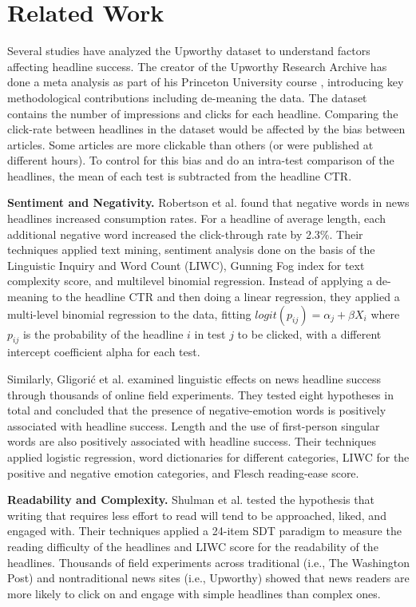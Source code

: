 \documentclass[11pt]{article}
\begin{document}
\section{Related Work}

Several studies have analyzed the Upworthy dataset to understand factors affecting headline success. The creator of the Upworthy Research Archive has done a meta analysis as part of his Princeton University course \cite{matias2020meta}, introducing key methodological contributions including de-meaning the data. The dataset contains the number of impressions and clicks for each headline. Comparing the click-rate between headlines in the dataset would be affected by the bias between articles. Some articles are more clickable than others (or were published at different hours). To control for this bias and do an intra-test comparison of the headlines, the mean of each test is subtracted from the headline CTR.

\textbf{Sentiment and Negativity.} Robertson et al. \cite{robertson2023negativity} found that negative words in news headlines increased consumption rates. For a headline of average length, each additional negative word increased the click-through rate by 2.3\%. Their techniques applied text mining, sentiment analysis done on the basis of the Linguistic Inquiry and Word Count (LIWC), Gunning Fog index for text complexity score, and multilevel binomial regression. Instead of applying a de-meaning to the headline CTR and then doing a linear regression, they applied a multi-level binomial regression to the data, fitting $logit(p_{ij}) = \alpha_j + \beta X_i$ where $p_{ij}$ is the probability of the headline $i$ in test $j$ to be clicked, with a different intercept coefficient alpha for each test.

Similarly, Gligorić et al. \cite{munger2023linguistic} examined linguistic effects on news headline success through thousands of online field experiments. They tested eight hypotheses in total and concluded that the presence of negative-emotion words is positively associated with headline success. Length and the use of first-person singular words are also positively associated with headline success. Their techniques applied logistic regression, word dictionaries for different categories, LIWC for the positive and negative emotion categories, and Flesch reading-ease score.

\textbf{Readability and Complexity.} Shulman et al. \cite{shulman2024reading} tested the hypothesis that writing that requires less effort to read will tend to be approached, liked, and engaged with. Their techniques applied a 24-item SDT paradigm to measure the reading difficulty of the headlines and LIWC score for the readability of the headlines. Thousands of field experiments across traditional (i.e., The Washington Post) and nontraditional news sites (i.e., Upworthy) showed that news readers are more likely to click on and engage with simple headlines than complex ones.
\end{document}
